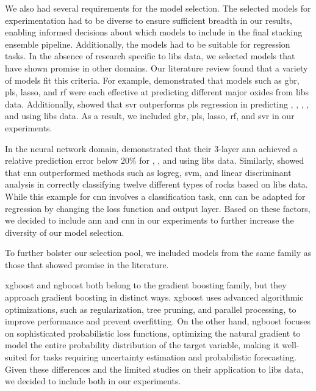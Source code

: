 We also had several requirements for the model selection.
The selected models for experimentation had to be diverse to ensure sufficient breadth in our results, enabling informed decisions about which models to include in the final stacking ensemble pipeline.
Additionally, the models had to be suitable for regression tasks.
In the absence of research specific to \gls{libs} data, we selected models that have shown promise in other domains.
Our literature review found that a variety of models fit this criteria.
For example, \citet{andersonPostlandingMajorElement2022} demonstrated that models such as \gls{gbr}, \gls{pls}, \gls{lasso}, and \gls{rf} were each effective at predicting different major oxides from \gls{libs} data.
Additionally, \citet{svrforlibs} showed that \gls{svr} outperforms \gls{pls} regression in predicting , , , , and  using \gls{libs} data.
As a result, we included \gls{gbr}, \gls{pls}, \gls{lasso}, \gls{rf}, and \gls{svr} in our experiments.

In the neural network domain, \citet{ann_libs_soil_analysis} demonstrated that their 3-layer \gls{ann} achieved a relative prediction error below 20\% for , , and  using \gls{libs} data.
Similarly, \citet{yangConvolutionalNeuralNetwork2022} showed that \gls{cnn} outperformed methods such as \gls{logreg}, \gls{svm}, and linear discriminant analysis in correctly classifying twelve different types of rocks based on \gls{libs} data.
While this example for \gls{cnn} involves a classification task, \gls{cnn} can be adapted for regression by changing the loss function and output layer.
Based on these factors, we decided to include \gls{ann} and \gls{cnn} in our experiments to further increase the diversity of our model selection.

To further bolster our selection pool, we included models from the same family as those that showed promise in the literature.

\gls{xgboost} and \gls{ngboost} both belong to the gradient boosting family, but they approach gradient boosting in distinct ways.
\gls{xgboost} uses advanced algorithmic optimizations, such as regularization, tree pruning, and parallel processing, to improve performance and prevent overfitting. 
On the other hand, \gls{ngboost} focuses on sophisticated probabilistic loss functions, optimizing the natural gradient to model the entire probability distribution of the target variable, making it well-suited for tasks requiring uncertainty estimation and probabilistic forecasting.
Given these differences and the limited studies on their application to \gls{libs} data, we decided to include both in our experiments.


